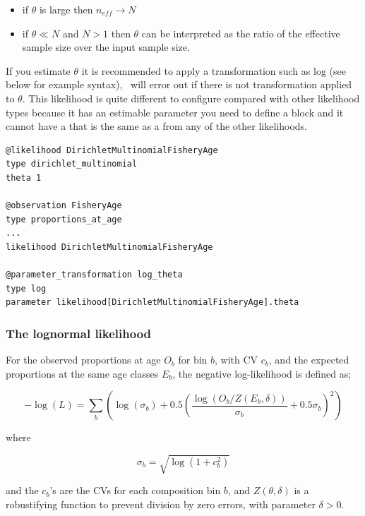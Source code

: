 \begin{itemize}
	\item if \(\theta\) is large then \(n_{eff} \rightarrow N\)
	\item if \(\theta \ll N \) and \(N > 1\) then \(\theta\) can be interpreted as the ratio of the effective sample size over the input sample size.
\end{itemize}

If you estimate \(\theta\) it is recommended to apply a transformation such as log (see below for example syntax), \CNAME\ will error out if there is not transformation applied to \(\theta\). This likelihood is quite different to configure compared with other likelihood types because it has an estimable parameter you need to define a  block and it cannot have a  that is the same as a  from any of the other likelihoods.

{\small{\begin{verbatim}
@likelihood DirichletMultinomialFisheryAge
type dirichlet_multinomial
theta 1

@observation FisheryAge
type proportions_at_age
...
likelihood DirichletMultinomialFisheryAge

@parameter_transformation log_theta
type log
parameter likelihood[DirichletMultinomialFisheryAge].theta
\end{verbatim}}}

\subsubsection{The lognormal likelihood }

For the observed proportions at age $O_b$ for bin $b$, with CV $c_b$, and the expected proportions at the same age classes $E_b$, the negative log-likelihood is defined as;

\begin{equation}
	- \log \left(L \right) = \sum\limits_b \left( \log \left( \sigma_b \right) + 0.5\left( \frac{\log \left(O_b / Z \left(E_b,\delta \right) \right)}{\sigma_b} + 0.5 \sigma_b \right)^2 \right)
\end{equation}

where

\begin{equation}
	\sigma_b  = \sqrt{\log \left(1+c_b^2 \right)}
\end{equation}

and the $c_b$'s are the CVs for each composition bin $b$, and $Z \left(\theta,\delta \right)$ is a robustifying function to prevent division by zero errors, with parameter $\delta>0$.

